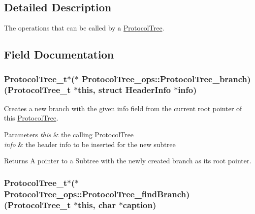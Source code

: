 \subsection{Detailed Description}
The operations that can be called by a \hyperlink{struct_protocol_tree}{Protocol\-Tree}. 

\subsection{Field Documentation}
\hypertarget{struct_protocol_tree__ops_ac1928d62cf84464df8c5ab377b3599d0}{
\subsubsection[{Protocol\-Tree\-\_\-branch}]{\setlength{\rightskip}{0pt plus 5cm}Protocol\-Tree\-\_\-t$\ast$($\ast$ Protocol\-Tree\-\_\-ops\-::\-Protocol\-Tree\-\_\-branch)(Protocol\-Tree\-\_\-t $\ast$this, struct {\bf Header\-Info} $\ast$info)}}\label{struct_protocol_tree__ops_ac1928d62cf84464df8c5ab377b3599d0}


Creates a new branch with the given info field from the current root pointer of this \hyperlink{struct_protocol_tree}{Protocol\-Tree}. 


\begin{DoxyParams}{Parameters}
{\em this} & the calling \hyperlink{struct_protocol_tree}{Protocol\-Tree} \\
\hline
{\em info} & the header info to be inserted for the new subtree\\
\hline
\end{DoxyParams}
\begin{DoxyReturn}{Returns}
A pointer to a Subtree with the newly created branch as its root pointer. 
\end{DoxyReturn}
\hypertarget{struct_protocol_tree__ops_a8429998583f5e91b4ae2ec19767158ae}{
\subsubsection[{Protocol\-Tree\-\_\-find\-Branch}]{\setlength{\rightskip}{0pt plus 5cm}Protocol\-Tree\-\_\-t$\ast$($\ast$ Protocol\-Tree\-\_\-ops\-::\-Protocol\-Tree\-\_\-find\-Branch)(Protocol\-Tree\-\_\-t $\ast$this, char $\ast${\bf caption})}}\label{struct_protocol_tree__ops_a8429998583f5e91b4ae2ec19767158ae}



